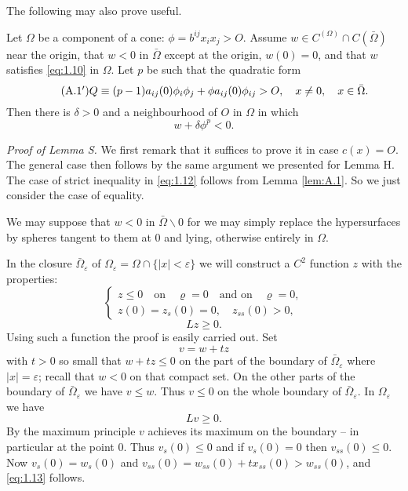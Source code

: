The following may also prove useful.
\begin{lemma}\label{lem:A.2}
	Let $\Omega$ be a component of a cone: $\phi=b^{ij}x_ix_j>O$. Assume $w\in C^(\Omega)\cap C(\bar{\Omega})$ near the origin, that $w<0$ in $\bar{\Omega}$ except at the origin, $w(0)=0$, and that $w$ satisfies \eqref{eq:1.10} in $\Omega$. Let $p$ be such that the quadratic form
	\begin{equation}\tag{A.1$^{\prime}$}\label{eq:A.1prime}
		Q\equiv (p-1)a_{ij}(0)\phi_i\phi_j + \phi a_{ij}(0) \phi_{ij} >O , \quad x\neq 0,\quad  x\in\bar{\Omega}.
	\end{equation}
	Then there is $\delta>0$ and a neighbourhood of $O$ in $\Omega$ in which
	\[w+\delta\phi^p<0.\]
\end{lemma}

\noindent
\textit{Proof of Lemma S. }We first remark that it suffices to prove it in case $c(x)= O$. The general case then follows by the same argument we presented for Lemma H. The case of strict inequality in \eqref{eq:1.12} follows from Lemma \ref{lem:A.1}. So we just consider the case of equality.

We may suppose that $w < 0$ in $\bar{\Omega}\backslash 0$ for we may simply replace the hypersurfaces by spheres tangent to them at 0 and lying, otherwise entirely in $\Omega$.

In the closure $\bar{\Omega}_{\varepsilon}$ of $\Omega_{\varepsilon} = \Omega\cap\{|x|<\varepsilon\}$ we will construct a $C^2$ function $z$ with the properties:
\begin{equation}\label{eq:A.2}
	\begin{cases}
		z\leq  0 \quad\text{on}\quad\varrho=0\quad\text{and on}\quad\varrho=0,\\
		z(0) = z_s(0) = 0,\quad z_{ss}(0) > 0,
	\end{cases}
\end{equation}
\begin{equation}\label{eq:A.3}
	Lz\geq  0.
\end{equation}
Using such a function the proof is easily carried out. Set
\[v=w+tz\]
with $t > 0$ so small that $w + tz \leq  0$ on the part of the boundary of $\bar{\Omega}_{\varepsilon}$ where $|x| = \varepsilon$; recall that $w < 0$ on that compact set. On the other parts of the boundary of $\bar{\Omega}_{\varepsilon}$ we have $v \leq  w$. Thus $v \leq  0$ on the whole boundary of $\bar{\Omega}_{\varepsilon}$. In $\Omega_{\varepsilon}$ we have
\begin{equation}\label{eq:A.4}
	Lv\geq 0.
\end{equation}
By the maximum principle $v$ achieves its maximum on the boundary -- in particular at the point 0. Thus $v_s(0)\leq 0$ and if $v_s(0)=0$ then $v_{ss}(0)\leq 0$. Now $v_s(0)= w_s(0)$ and $v_{ss}(0) = w_{ss}(0) + tx_{ss}(0) > w_{ss}(0)$, and \eqref{eq:1.13} follows.

